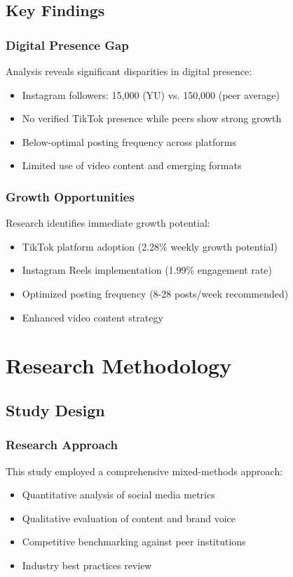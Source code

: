 \documentclass[12pt]{report}
\begin{document}
\section{Key Findings}
\subsection{Digital Presence Gap}
Analysis reveals significant disparities in digital presence:
\begin{itemize}
    \item Instagram followers: 15,000 (YU) vs. 150,000 (peer average)
    \item No verified TikTok presence while peers show strong growth
    \item Below-optimal posting frequency across platforms
    \item Limited use of video content and emerging formats
\end{itemize}

\subsection{Growth Opportunities}
Research identifies immediate growth potential:
\begin{itemize}
    \item TikTok platform adoption (2.28\% weekly growth potential)
    \item Instagram Reels implementation (1.99\% engagement rate)
    \item Optimized posting frequency (8-28 posts/week recommended)
    \item Enhanced video content strategy
\end{itemize}

\chapter{Research Methodology}

\section{Study Design}
\subsection{Research Approach}
This study employed a comprehensive mixed-methods approach:
\begin{itemize}
    \item Quantitative analysis of social media metrics
    \item Qualitative evaluation of content and brand voice
    \item Competitive benchmarking against peer institutions
    \item Industry best practices review
\end{itemize}
\end{document}
